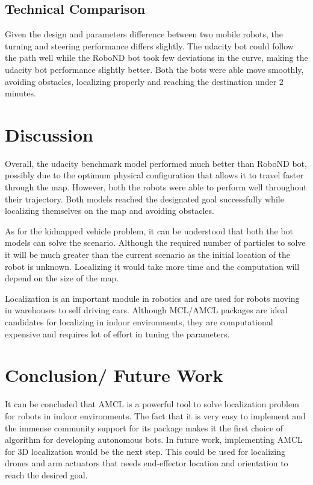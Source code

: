 \documentclass[10pt,journal,compsoc]{IEEEtran}
\begin{document}
\subsection{Technical Comparison}
Given the design and parameters difference between two mobile robots, the turning and steering performance differs slightly. The udacity bot could follow the path well while the RoboND bot took few deviations in the curve, making the udacity bot performance slightly better. Both the bots were able move smoothly, avoiding obstacles, localizing properly and reaching the destination under 2 minutes.

\section{Discussion}
Overall, the udacity benchmark model performed much better than RoboND bot, possibly due to the optimum physical configuration that allows it to travel faster through the map. However, both the robots were able to perform well throughout their trajectory. Both models reached the designated goal successfully while localizing themselves on the map and avoiding obstacles.

As for the kidnapped vehicle problem, it can be understood that both the bot models can solve the scenario. Although the required number of particles to solve it will be much greater than the current scenario as the initial location of the robot is unknown. Localizing it would take more time and the computation will depend on the size of the map.

Localization is an important module in robotics and are used for robots moving in warehouses to self driving cars. Although MCL/AMCL packages are ideal candidates for localizing in indoor environments, they are computational expensive and requires lot of effort in tuning the parameters.

\section{Conclusion/ Future Work}
It can be concluded that AMCL is a powerful tool to solve localization problem for robots in indoor environments. The fact that it is very easy to implement and the immense community support for its package makes it the first choice of algorithm for developing autonomous bots. In future work, implementing AMCL for 3D localization would be the next step. This could be used for localizing drones and arm actuators that needs end-effector location and  orientation to reach the desired goal.



\end{document}
